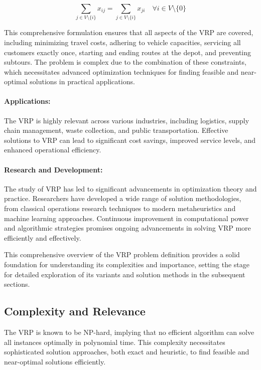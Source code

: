 \documentclass[
]{article}
\begin{document}
    \begin{equation}
        \sum_{j \in V \setminus \{i\}} x_{ij} = \sum_{j \in V \setminus \{i\}} x_{ji} \quad \forall i \in V \setminus \{0\}
    \end{equation}

    This comprehensive formulation ensures that all aspects of the VRP are covered, including minimizing travel costs, adhering to vehicle capacities, servicing all customers exactly once, starting and ending routes at the depot, and preventing subtours. The problem is complex due to the combination of these constraints, which necessitates advanced optimization techniques for finding feasible and near-optimal solutions in practical applications.

    \paragraph{Applications:}
    The VRP is highly relevant across various industries, including logistics, supply chain management, waste collection, and public transportation. Effective solutions to VRP can lead to significant cost savings, improved service levels, and enhanced operational efficiency.

    \paragraph{Research and Development:}
    The study of VRP has led to significant advancements in optimization theory and practice. Researchers have developed a wide range of solution methodologies, from classical operations research techniques to modern metaheuristics and machine learning approaches. Continuous improvement in computational power and algorithmic strategies promises ongoing advancements in solving VRP more efficiently and effectively.

    This comprehensive overview of the VRP problem definition provides a solid foundation for understanding its complexities and importance, setting the stage for detailed exploration of its variants and solution methods in the subsequent sections.

    \subsection{Complexity and Relevance}\label{subsec:complexity-and-relevance}
    The VRP is known to be NP-hard, implying that no efficient algorithm can solve all instances optimally in polynomial time. This complexity necessitates sophisticated solution approaches, both exact and heuristic, to find feasible and near-optimal solutions efficiently.
\end{document}

